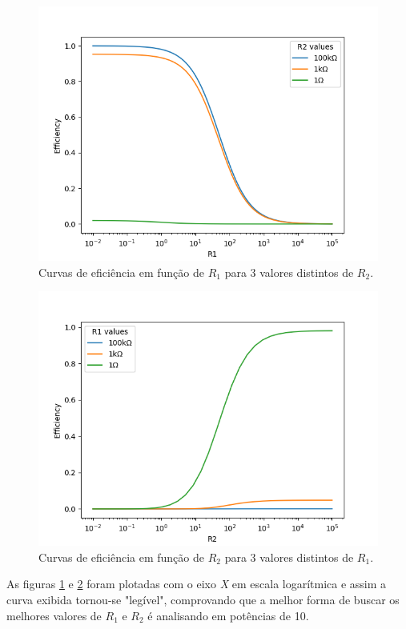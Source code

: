 \documentclass[12pt]{article}
\begin{document}
\begin{figure}
    \centering
    \includegraphics{fig/efficiency_vs_r1.png}
    \caption{Curvas de eficiência em função de $R_1$ para 3 valores distintos de $R_2$.}
    \label{fig:efr1}
\end{figure}

\begin{figure}
    \centering
    \includegraphics{fig/efficiency_vs_r2.png}
    \caption{Curvas de eficiência em função de $R_2$ para 3 valores distintos de $R_1$.}
    \label{fig:efr2}
\end{figure}

As figuras \ref{fig:efr1} e \ref{fig:efr2} foram plotadas com o eixo \textit{X} em escala logarítmica e assim a curva exibida tornou-se "legível", comprovando que a melhor forma de buscar os melhores valores de $R_1$ e $R_2$ é analisando em potências de 10.
\end{document}
